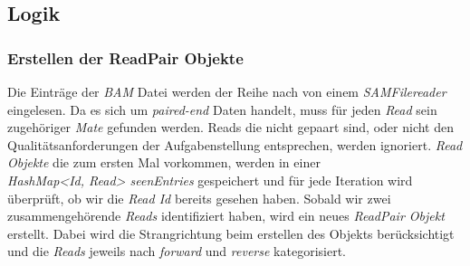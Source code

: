 \documentclass[12pt]{article}
\begin{document}
\subsection{Logik}
\subsubsection{Erstellen der ReadPair Objekte}

Die Einträge der \textit{BAM} Datei werden der Reihe nach von einem \textit{SAMFilereader} eingelesen. Da es
sich um \textit{paired-end} Daten handelt, muss für jeden \textit{Read} sein zugehöriger \textit{Mate} gefunden werden. 
Reads die nicht gepaart sind, oder nicht den Qualitätsanforderungen der Aufgabenstellung entsprechen,
werden ignoriert.
\textit{Read Objekte} die zum ersten Mal vorkommen, werden in einer \\ \textit{HashMap<Id, Read> seenEntries}
gespeichert und für jede Iteration wird überprüft, ob wir die \textit{Read Id} bereits gesehen haben.
Sobald wir zwei zusammengehörende \textit{Reads} identifiziert haben, wird ein neues
\textit{ReadPair Objekt} erstellt. Dabei wird die Strangrichtung beim erstellen des Objekts berücksichtigt und
die \textit{Reads} jeweils nach \textit{forward} und \textit{reverse} kategorisiert.
\newpage
\end{document}
